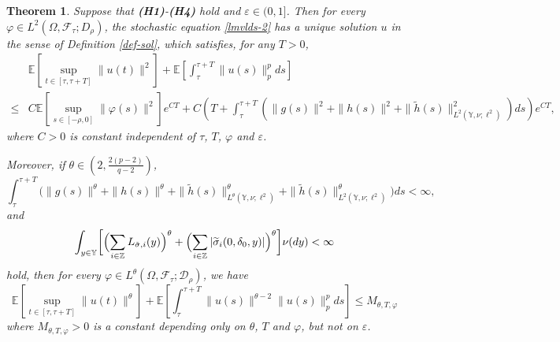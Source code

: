 \documentclass[11pt]{article}
\numberwithin{equation}{section}
\theoremstyle{plain}
\newtheorem{theorem}{Theorem}[section]
\begin{document}
\begin{theorem}\label{wp-sol}
   Suppose that {\bf(H1)}-{\bf(H4)} hold
   and $\varepsilon \in (0,1]$.
   Then for every $\varphi \in L^2( \Omega, \mathcal{F}_\tau;  D_{\rho} )$, the stochastic 
   equation
   \eqref{lmvlds-2} has a unique solution $u$ in the sense of Definition \ref{def-sol},
   which satisfies,
  for any $T > 0$,
   \begin{align}\label{secondmoment}
          & \mathbb{E} \left[ \sup_{t \in [\tau,\tau+T]} \|u(t)\|^2 \right]
            + \mathbb{E} \left[ \int_{\tau}^{\tau+T} \|u(s)\|^p_p ds \right]  \nonumber\\
     \le & C \mathbb{E} \left[ \sup_{s \in [-\rho,0]} \|\varphi(s)\|^2 \right] e^{C T}  
         + C \left( T
                       + \int_{\tau}^{\tau + T}
                               \left( \|g(s)\|^2 + \|h(s)\|^2 +  \| \widetilde{h}(s) \|^2_{L^2(\mathbb{Y}, \nu; \ell^2)}
                               \right)ds
                \right) e^{C T},
   \end{align}
   where   $C>0$
   is constant    independent of $\tau$, $T$, $\varphi$
   and $\varepsilon$.
   
   Moreover, 
   if  
   $\theta \in \left(2, \tfrac{2(p-2)}{q-2} \right)$,
   \begin{equation}\label{thetaassum1}
   	     \int_{\tau}^{\tau+T}
   	         \bigl( \|g(s)\|^\theta 
   	                   + \|h(s)\|^\theta
   	                   + \|\widetilde{h}(s)\|_{L^\theta(\mathbb{Y}, \nu; \ell^2)}^\theta
   	                   + \|\widetilde{h}(s)\|_{L^2(\mathbb{Y}, \nu; \ell^2)}^\theta
          	 \bigr) ds
   	      < \infty,
   \end{equation}
   and
   \begin{equation}\label{thetaassum2}
         \int_{y \in \mathbb{Y} }
   	         \biggl[ 
   	                    \Bigl( \sum_{i \in \mathbb{Z}} L_{\tilde{\sigma}, i}(y) 
   	                    \Bigr)^{\theta}
   	                   + 
   	                   \Bigl( \sum_{i \in \mathbb{Z}} |\widetilde{\sigma}_{i}(0, \delta_{0}, y) |
   	                      \Bigr)^{\theta}
   	         \biggr] \nu(dy)
   	      < \infty 
   \end{equation}
   hold, 
   then for every 
   $\varphi \in L^{\theta}(\Omega,\mathcal{F}_\tau;\mathcal{D}_{\rho})$, 
   we have 
   \[ 
      \mathbb{E}
             \left[ \sup_{t \in [\tau, \tau+T] } 
                        \|u(t)\|^{\theta}
             \right]
       + \mathbb{E}
                 \left[ \int_{\tau}^{\tau+T} 
                              \|u(s)\|^{\theta-2} \|u(s)\|_{p}^{p} 
                           ds
                 \right]  
   \le
   M_{\theta,T,\varphi} 
   \] 
   where $M_{\theta,T,\varphi}>0$ is a constant   depending 
   only on $\theta$, $T$ and $\varphi$, but not
   on $\varepsilon$.
\end{theorem}
\end{document}
